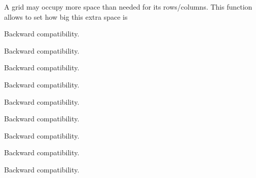 
A grid may occupy more space than needed for its rows/columns. This
function allows to set how big this extra space is

\label{wxgridwxgrid}


Backward compatibility.

\label{wxgridupdatedimensions}


Backward compatibility.

\label{wxgridgetrows}


Backward compatibility.

\label{wxgridgetcols}


Backward compatibility.

\label{wxgridgetcursorrow}


Backward compatibility.

\label{wxgridgetcursorcolumn}


Backward compatibility.

\label{wxgridgetscrollposx}


Backward compatibility.

\label{wxgridgetscrollposy}


Backward compatibility.

\label{wxgridsetscrollx}


Backward compatibility.


